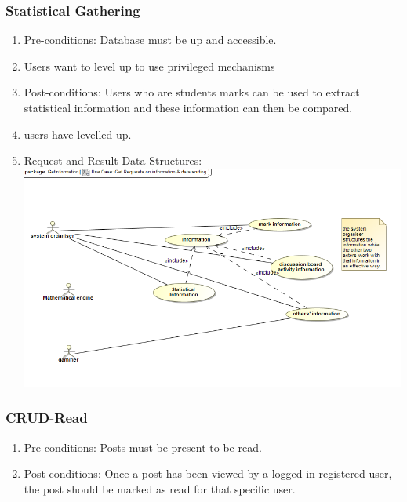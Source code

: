 \documentclass[hidelinks, 12pt, oneside]{article}
\begin{document}
\subsubsection{Statistical Gathering}
\begin{enumerate}
 \item Pre-conditions: Database must be up and accessible.
 \\
 \item Users want to level up to use privileged mechanisms 
\\

\item Post-conditions: Users who are students marks can be used to extract statistical information and these information can then be compared.
\\  
  \item users have levelled up.
  \\
  
 \item Request and Result Data Structures:\\
  \includegraphics[scale=0.4]{getInformation}\\

\end{enumerate}



\subsubsection{CRUD-Read}
\begin{enumerate}
 \item Pre-conditions: Posts must be present to be read.
 \\
 \item Post-conditions: Once a post has been viewed by a logged in registered user, the post should be marked as read for that specific user.
  \\

\end{enumerate}
\end{document}
